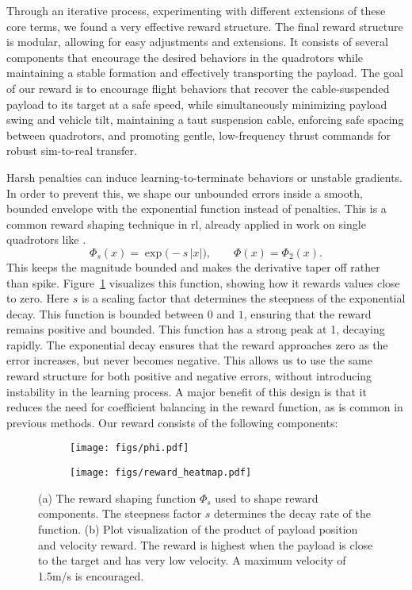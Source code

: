 Through an iterative process, experimenting with different extensions of these core terms, we found a very effective reward structure. The final reward structure is modular, allowing for easy adjustments and extensions. It consists of several components that encourage the desired behaviors in the quadrotors while maintaining a stable formation and effectively transporting the payload.
The goal of our reward is to encourage flight behaviors that recover the cable-suspended payload to its target at a safe speed, while simultaneously minimizing payload swing and vehicle tilt, maintaining a taut suspension cable, enforcing safe spacing between quadrotors, and promoting gentle, low-frequency thrust commands for robust sim-to-real transfer. 

Harsh penalties can induce learning-to-terminate behaviors or unstable gradients. In order to prevent this, we shape our unbounded errors inside a smooth, bounded envelope with the exponential function instead of penalties. This is a common reward shaping technique in \gls{rl}, already applied in work on single quadrotors like \cite{kaufmann_champion-level_2023}.
\begin{equation}
\Phi_s(x) = \exp\bigl(-s\,\lvert x\rvert\bigr),
\qquad
\Phi(x) = \Phi_2(x).
\end{equation}
 This keeps the magnitude bounded and makes the derivative taper off rather than spike. Figure~\ref{fig:reward_details} visualizes this function, showing how it rewards values close to zero. Here $s$ is a scaling factor that determines the steepness of the exponential decay. This function is bounded between $0$ and $1$, ensuring that the reward remains positive and bounded. This function has a strong peak at 1, decaying rapidly. The exponential decay ensures that the reward approaches zero as the error increases, but never becomes negative. This allows us to use the same reward structure for both positive and negative errors, without introducing instability in the learning process. A major benefit of this design is that it reduces the need for coefficient balancing in the reward function, as is common in previous methods. Our reward consists of the following components:
\begin{figure}

  \centering
  \begin{subfigure}[t]{0.49\textwidth}
    \centering
    \texttt{[image: figs/phi.pdf]}
    \caption{}
  \end{subfigure}
  \begin{subfigure}[t]{0.49\textwidth}
    \centering
    \texttt{[image: figs/reward\_heatmap.pdf]}
    \caption{}
  \end{subfigure}
  \caption[Reward Components]{
    (a) The reward shaping function \(\Phi_s\) used to shape reward components. The steepness factor \(s\) determines the decay rate of the function.
    (b) Plot visualization of the product of payload position and velocity reward. The reward is highest when the payload is close to the target and has very low velocity. A maximum velocity of 1.5m/s is encouraged.
  }
  \label{fig:reward_details}
\end{figure}
